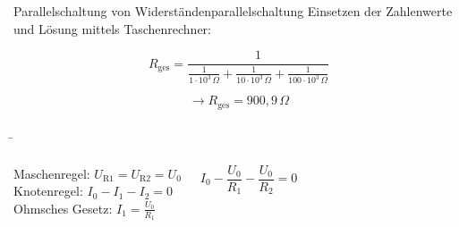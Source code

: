 \begin{frame}
{\begin{bsp}{Parallelschaltung von Widerständen}{parallelschaltung}
			Einsetzen der Zahlenwerte und Lösung mittels Taschenrechner:

			\begin{equation*}
				R_\mathrm{ges} = \frac{1}{\frac{1}{1\cdot 10^3 \, \Omega} + \frac{1}{10\cdot 10^3 \, \Omega} + \frac{1}{100 \cdot 10^3 \, \Omega}}
			\end{equation*}

			\begin{equation*}
				\rightarrow R_\mathrm{ges} = 900,9 \, \Omega
			\end{equation*}




	\end{bsp}	


	









	}

	\b{
	\begin{columns}

		Maschenregel: $U_\mathrm{R1} = U_\mathrm{R2} = U_0$\\
 
		Knotenregel: $I_0 - I_1 - I_2 = 0$\\
		
		Ohmsches Gesetz: $I_1 = \frac{U_0}{R_1}$ %
 
 
		\begin{equation*}
			I_0 - \frac{U_0}{R_1} - \frac{U_0}{R_2} = 0
		\end{equation*}


	
 
 
 
 
		
 
 
\end{columns}}
\end{frame}
